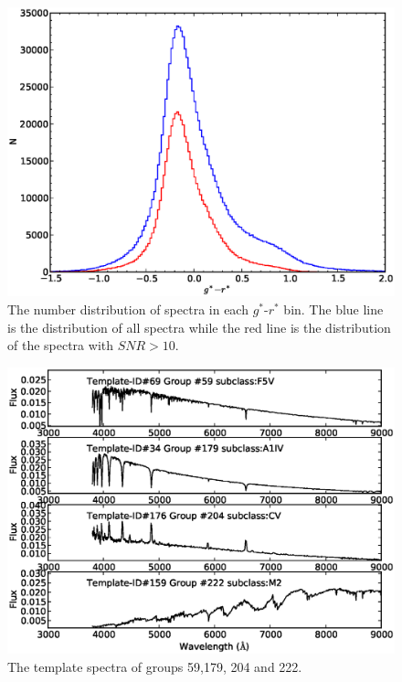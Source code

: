 \documentclass[manuscript]{aastex}
\begin{document}
    \begin{figure}
   \centering
   \includegraphics[width=14cm, angle=0,clip]{f2.eps}
   \caption{The number distribution of spectra in each $g^*$-$r^*$ bin.
   The blue line is the distribution of all spectra while the red line is the distribution of the spectra with $SNR>10$.
   }
   \label{Fig4}
   \end{figure}

    \begin{figure}
   \centering
   \includegraphics[width=14cm, angle=0,clip]{f6.eps}
   \caption{The template spectra of groups 59,179, 204 and 222.
   }
   \label{Fig6}
\end{figure}
\end{document}
